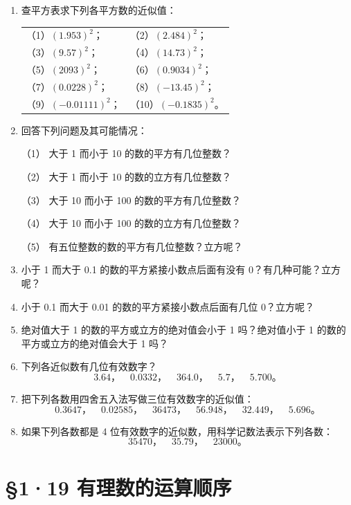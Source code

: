 \begin{enumerate}
\item 查平方表求下列各平方数的近似值：
  \par\smallskip
  \begin{tabular}{@{}ll@{}}
  （1）\((1.953)^2\)；\qquad\qquad & （2）\((2.484)^2\)； \\[4pt]
  （3）\((9.57)^2\)； & （4）\((14.73)^2\)； \\[4pt]
  （5）\((2093)^2\)； & （6）\((0.9034)^2\)； \\[4pt]
  （7）\((0.0228)^2\)； & （8）\((-13.45)^2\)； \\[4pt]
  （9）\((-0.01111)^2\)； & （10）\((-0.1835)^2\)。
  \end{tabular}

\item 回答下列问题及其可能情况：
  \par\smallskip
  （1） 大于 1 而小于 10 的数的平方有几位整数？
  \par
  （2） 大于 1 而小于 10 的数的立方有几位整数？
  \par
  （3） 大于 10 而小于 100 的数的平方有几位整数？
  \par
  （4） 大于 10 而小于 100 的数的立方有几位整数？
  \par
  （5） 有五位整数的数的平方有几位整数？立方呢？

\item 小于 1 而大于 0.1 的数的平方紧接小数点后面有没有 0？有几种可能？立方呢？
\item 小于 0.1 而大于 0.01 的数的平方紧接小数点后面有几位 0？立方呢？
\item 绝对值大于 1 的数的平方或立方的绝对值会小于 1 吗？绝对值小于 1 的数的平方或立方的绝对值会大于 1 吗？
\item 下列各近似数有几位有效数字？
  \[
  3.64， \quad 0.0332， \quad 364.0， \quad 5.7， \quad 5.700。
  \]
\item 把下列各数用四舍五入法写做三位有效数字的近似值：
  \[
  0.3647， \quad 0.02585， \quad 36473， \quad 56.948， \quad 32.449， \quad 5.696。
  \]
\filbreak
\item 如果下列各数都是 4 位有效数字的近似数，用科学记数法表示下列各数：
  \[
  35470， \quad 35.79， \quad 23000。
  \]
\end{enumerate}

\section{§1·19 有理数的运算顺序}

